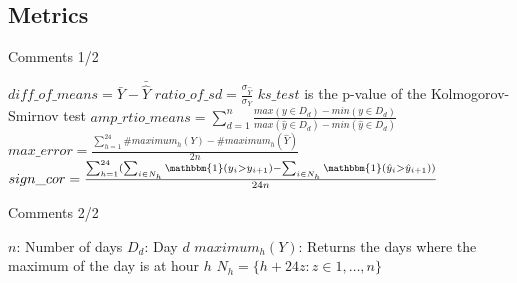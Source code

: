\documentclass[xcolor=dvipsnames]{beamer}
\begin{document}
    \subsection{Metrics}
    \begin{frame}{}
    \end{frame}

    \begin{frame}{Comments 1/2}
        \begin{outline}
            \1 $diff\_of\_means = \bar{Y} - \bar{\hat{Y}}$
            \1 $ratio\_of\_sd = \frac{\sigma_{\hat{Y}}}{\sigma_{Y}}$    
            \1 $ks\_test$ is the p-value of the Kolmogorov-Smirnov test
            \1 $amp\_rtio\_means = \sum_{d=1}^{n}\frac{max({y \in D_d}) - min({y \in D_d})}{max({\hat{y} \in D_d}) - min({\hat{y} \in D_d})}$
            \1 $max\_error = \frac{\sum_{h=1}^{24}\#maximum_h(Y) - \#maximum_h(\hat{Y})}{2n}$
            \1 $sign\_cor = \frac{\sum_{h=1}^{24}(\sum_{i \in N_h}\mathbbm{1}(y_i > y_{i+1}) - \sum_{i \in N_h}\mathbbm{1}(\hat{y}_i > \hat{y}_{i+1}))}{24n}$    
        \end{outline}
    \end{frame}

    \begin{frame}{Comments 2/2}
        \begin{outline}
            \1 $n$: Number of days
            \1 $D_d$: Day $d$
            \1 $maximum_h(Y)$: Returns the days where the maximum of the day is at hour $h$
            \1 $N_h = \{h + 24z: z \in {1, \ldots, n}\}$
        \end{outline}
    \end{frame}
\end{document}
